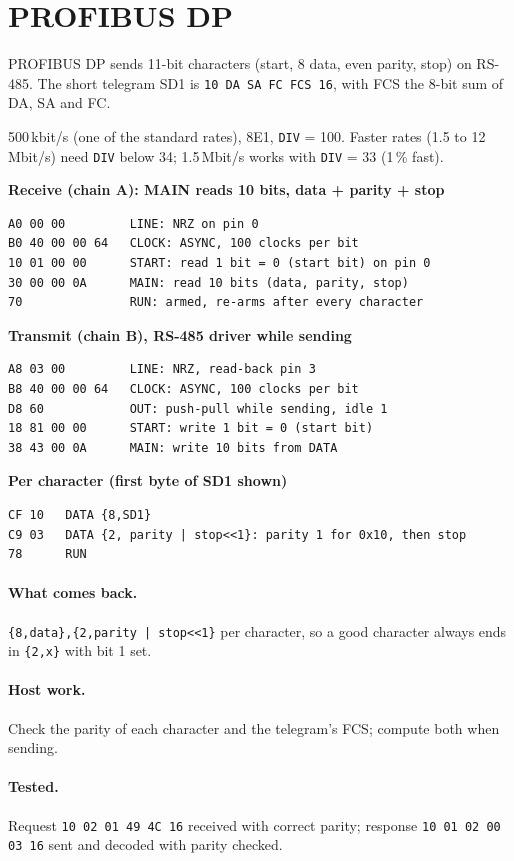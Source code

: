 \documentclass[11pt,a4paper]{article}
\newcommand{\sig}[1]{\texttt{#1}}
\newcommand{\progtitle}[1]{\par\smallskip\textbf{\small\color{accent}#1}\par\nopagebreak}
\newcommand{\facts}[1]{\par\noindent\colorbox{codebg}{\parbox{\dimexpr\linewidth-2\fboxsep}{\small #1}}\par}
\begin{document}
\section{PROFIBUS DP}
PROFIBUS DP sends 11-bit characters (start, 8 data, even parity, stop) on RS-485. The short telegram SD1 is \texttt{10 DA SA FC FCS 16}, with FCS the 8-bit sum of DA, SA and FC.
\facts{500\,kbit/s (one of the standard rates), 8E1, \sig{DIV} = 100. Faster rates (1.5 to 12\,Mbit/s) need \sig{DIV} below 34; 1.5\,Mbit/s works with \sig{DIV} = 33 (1\,\% fast).}
\progtitle{Receive (chain A): MAIN reads 10 bits, data + parity + stop}
\begin{lstlisting}
A0 00 00         LINE: NRZ on pin 0
B0 40 00 00 64   CLOCK: ASYNC, 100 clocks per bit
10 01 00 00      START: read 1 bit = 0 (start bit) on pin 0
30 00 00 0A      MAIN: read 10 bits (data, parity, stop)
70               RUN: armed, re-arms after every character
\end{lstlisting}
\progtitle{Transmit (chain B), RS-485 driver while sending}
\begin{lstlisting}
A8 03 00         LINE: NRZ, read-back pin 3
B8 40 00 00 64   CLOCK: ASYNC, 100 clocks per bit
D8 60            OUT: push-pull while sending, idle 1
18 81 00 00      START: write 1 bit = 0 (start bit)
38 43 00 0A      MAIN: write 10 bits from DATA
\end{lstlisting}
\progtitle{Per character (first byte of SD1 shown)}
\begin{lstlisting}
CF 10   DATA {8,SD1}
C9 03   DATA {2, parity | stop<<1}: parity 1 for 0x10, then stop
78      RUN
\end{lstlisting}
\paragraph{What comes back.} \texttt{\{8,data\},\{2,parity | stop<<1\}} per character, so a good character always ends in \texttt{\{2,x\}} with bit 1 set.

\paragraph{Host work.} Check the parity of each character and the telegram's FCS; compute both when sending.

\paragraph{Tested.} Request \texttt{10 02 01 49 4C 16} received with correct parity; response \texttt{10 01 02 00 03 16} sent and decoded with parity checked.
\end{document}
